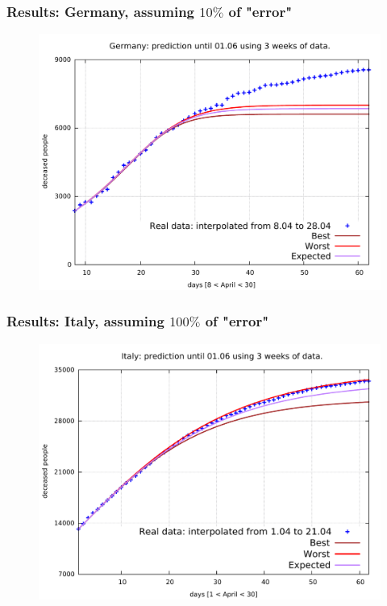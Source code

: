 \documentclass{beamer}
\begin{document}
\begin{frame}
	\frametitle{Results: Germany, assuming $10\%$ of "error"}
	\begin{figure}
\includegraphics[width=\linewidth]{../../err10p_simulations/de/8-28/8-28.pdf}
	\end{figure}
\end{frame}


\begin{frame}
	\frametitle{Results: Italy, assuming $100\%$ of "error"}
	\begin{figure}
\includegraphics[width=\linewidth]{../../err100p_simulations/it/1-21/1-21.pdf}
	\end{figure}
\end{frame}
\end{document}
